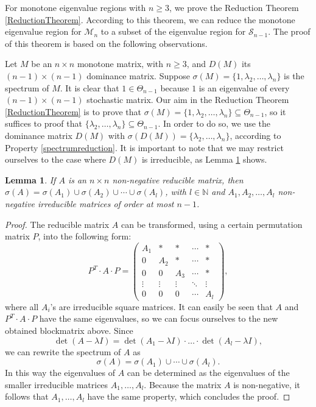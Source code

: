 \documentclass[11pt,a4paper]{article}
\newtheorem{lemma}[theorem]{Lemma}
\theoremstyle{definition}
\theoremstyle{remark}
\begin{document}
For monotone eigenvalue regions with \(n \geqslant 3\), we prove the Reduction Theorem \ref{ReductionTheorem}. According to this theorem, we can reduce the monotone eigenvalue region for \(\mathcal{M}_n\) to a subset of the eigenvalue region for \(\mathcal{S}_{n-1}\). The proof of this theorem is based on the following observations.

Let \(M\) be an \(n \times n\) monotone matrix, with \(n \geqslant 3 \), and \(D(M)\) its \((n-1) \times (n-1)\) dominance matrix. Suppose \(\sigma(M) = \{1, \lambda_2, \ldots, \lambda_{n} \}\) is the spectrum of \(M\). It is clear that \(1 \in \Theta_{n-1}\) because \(1\) is an eigenvalue of every \((n-1) \times (n-1) \) stochastic matrix. Our aim in the Reduction Theorem \ref{ReductionTheorem} is to prove that \(\sigma(M) = \{1, \lambda_2, \ldots, \lambda_{n}\} \subseteq \Theta_{n-1}\), so it suffices to proof that \(\{\lambda_2, \ldots, \lambda_{n} \} \subseteq \Theta_{n-1} \). In order to do so, we use the dominance matrix \(D(M)\) with \(\sigma(D(M)) = \{\lambda_2, \ldots, \lambda_{n} \}\), according to Property \ref{spectrumreduction}. It is important to note that we may restrict ourselves to the case where \(D(M)\) is irreducible, as Lemma \ref{ReducibeleGeval} shows.

\begin{lemma}\label{ReducibeleGeval}
    If \(A\) is an \(n \times n\) non-negative reducible matrix, then \(\sigma(A) = \sigma (A_1) \cup \sigma (A_2) \cup \cdots \cup \sigma (A_l)\), with \(l \in \mathbb{N}\) and \(A_1, A_2, \ldots, A_l\) non-negative irreducible matrices of order at most \(n-1\).
\end{lemma}
\begin{proof}        
The reducible matrix \(A\) can be transformed, using a certain permutation matrix \(P\), into the following form:
\[ P^T \cdot A \cdot P = \begin{pmatrix}
            A_1 & * & * & \cdots & * \\
            0 & A_2 & * & \cdots & * \\
            0 & 0 & A_3 & \cdots & * \\
            \vdots & \vdots & \vdots & \ddots & \vdots \\
            0 & 0 & 0 & \cdots & A_l 
\end{pmatrix}, \]
where all \(A_i\)'s are irreducible square matrices. It can easily be seen that \(A\) and \(P^T \cdot A \cdot P\) have the same eigenvalues, so we can focus ourselves to the new obtained blockmatrix above. Since
\[\det (A - \lambda I) = \det (A_1 - \lambda I) \cdot \ldots \cdot \det (A_l - \lambda I),\]
we can rewrite the spectrum of \(A\) as
\[ \sigma(A) = \sigma (A_1) \cup \cdots \cup \sigma (A_l).\]
In this way the eigenvalues of \(A\) can be determined as the eigenvalues of the smaller irreducible matrices \(A_1, \ldots , A_l\). Because the matrix \(A\) is non-negative, it follows that \(A_1, \ldots , A_l\) have the same property, which concludes the proof. 
\end{proof}
\end{document}

